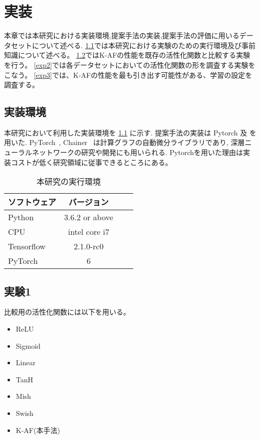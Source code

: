 \chapter{実装}
\label{implementation}

本章では本研究における実装環境,提案手法の実装,提案手法の評価に用いるデータセットについて述べる.
\ref{impl_env}では本研究における実験のための実行環境及び事前知識について述べる。
\ref{exp1}ではK-AFの性能を既存の活性化関数と比較する実験を行う。
\ref{exp2}では各データセットにおいての活性化関数の形を調査する実験をこなう。
\ref{exp3}では、K-AFの性能を最も引き出す可能性がある、学習の設定を調査する。



\section{実装環境}
\label{impl_env}



本研究において利用した実装環境を \ref{impl_table} に示す. 提案手法の実装は Pytorch 及
を用いた.  PyTorch~\cite{pytorch}, Chainer~\cite{chainer} は計算グラフの自動微分ライブラリであり, 深層ニューラルネットワークの研究や開発にも用いられる.
Pytorchを用いた理由は実装コストが低く研究領域に従事できるところにある。


\begin{table}[htbp]
\label{impl_table}
    \begin{center}
        \caption{本研究の実行環境}
        \vspace{5mm} 
        \begin{tabular}{l*{2}{c}r}
        ソフトウェア              & バージョン \\
        \hline
        Python            & 3.6.2 or above \\
        CPU               & intel core i7 \\
        Tensorflow        & 2.1.0-rc0 \\
        PyTorch           & 6 \\
        \end{tabular}
    \end{center}
\end{table}



\section{実験1}
\label{exp1}
比較用の活性化関数には以下を用いる。
\begin{itemize}
    \setlength{\parskip}{0cm} %
    \setlength{\itemsep}{0cm} %
    \item ReLU
    \item Sigmoid
    \item Linear
    \item TanH
    \item Mish
    \item Swish
    \item K-AF(本手法)
\end{itemize}


